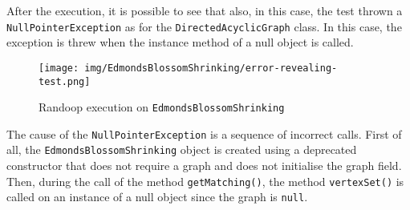\documentclass[a4paper,12pt]{article} %
\begin{document}
	After the execution, it is possible to see that also, in this case, the test thrown a \texttt{NullPointerException} as for the \texttt{DirectedAcyclicGraph} class.
	In this case, the exception is threw when the instance method of a null object is called.
	
	\begin{figure}[H]
		\centering
		\texttt{[image: img/EdmondsBlossomShrinking/error-revealing-test.png]}	
		\caption{Randoop execution on \texttt{EdmondsBlossomShrinking}}
		\label{fig:randtest-ed}
	\end{figure}
	
	
	
	
	The cause of the \texttt{NullPointerException} is a sequence of incorrect calls. 
	First of all, the \texttt{EdmondsBlossomShrinking} object is created using a deprecated constructor that does not require a graph and does not initialise the graph field. 
	Then, during the call of the method \texttt{getMatching()}, the method \texttt{vertexSet()} is called on an instance of a null object since the graph is \texttt{null}. 
	
\end{document}
